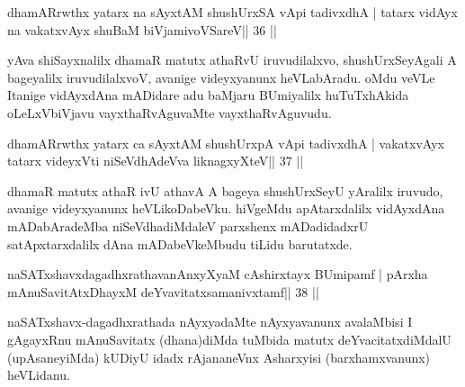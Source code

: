 
\begin{shl}
dhamARrwthx yatarx na sAyxtAM shushUrxSA vA\s pi tadivxdhA |
tatarx vidAyx na vakatxvAyx shuBaM biVjamivoVSareV\hfill || 36 ||
\end{shl}

\begin{artha}
yAva shiSayxnalilx dhamaR matutx athaRvU iruvudilalxvo, shushUrxSeyAgali A bageyalilx iruvudilalxvoV, avanige videyxyanunx heVLabAradu. oMdu veVLe Itanige vidAyxdAna mADidare adu baMjaru BUmiyalilx huTuTxhAkida oLeLxVbiVjavu vayxthaRvAguvaMte vayxthaRvAguvudu.
\end{artha} 
 

\begin{shl}
dhamARrwthx yatarx ca sAyxtAM shushUrxpA vA\s pi tadivxdhA |
vakatxvAyx tatarx videyxVti niSeVdhAdeVva liknagxyXteV\hfill || 37 ||
\end{shl}

\begin{artha}
dhamaR matutx athaR ivU athavA A bageya shushUrxSeyU yAralilx iruvudo,  avanige videyxyanunx heVLikoDabeVku. hiVgeMdu apAtarxdalilx vidAyxdAna mADabAradeMba niSeVdhadiMdaleV parxshenx mADadidadxrU satApxtarxdalilx dAna mADabeVkeMbudu tiLidu barutatxde.
\end{artha}


\begin{shl}
\footnotemark[7]naSATxshavxdagadhxrathavanAnxyXyaM cA\s\s shirxtayx BUmipamf |
pArxha mAnuSavitAtxDhayxM deYvavitatxsamanivxtamf\hfill || 38 ||
\end{shl}

\begin{artha}
naSATxshavx-dagadhxrathada nAyxyadaMte nAyxyavanunx avalaMbisi I gAgayxRnu mAnuSavitatx (dhana)diMda tuMbida matutx deYvacitatxdiMdalU (upAsaneyiMda) kUDiyU idadx rAjananeVnx Asharxyisi (barxhamxvanunx) heVLidanu.
\end{artha}


